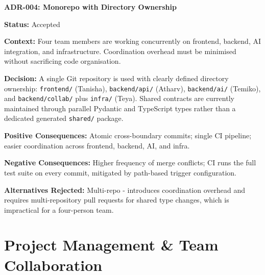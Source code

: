\documentclass{article}
\begin{document}
\vspace{15pt}
\noindent\textbf{ADR-004: Monorepo with Directory Ownership}

\vspace{3pt}
\noindent\textbf{Status:} Accepted

\vspace{3pt}
\noindent\textbf{Context:} Four team members are working concurrently on frontend, backend, AI integration, and infrastructure. Coordination overhead must be minimised without sacrificing code organisation.

\vspace{3pt}
\noindent\textbf{Decision:} A single Git repository is used with clearly defined directory ownership: \texttt{frontend/} (Tanisha), \texttt{backend/api/} (Atharv), \texttt{backend/ai/} (Temiko), and \texttt{backend/collab/} plus \texttt{infra/} (Teya). Shared contracts are currently maintained through parallel Pydantic and TypeScript types rather than a dedicated generated \texttt{shared/} package.

\vspace{3pt}
\noindent\textbf{Positive Consequences:} Atomic cross-boundary commits; single CI pipeline; easier coordination across frontend, backend, AI, and infra.

\vspace{3pt}
\noindent\textbf{Negative Consequences:} Higher frequency of merge conflicts; CI runs the full test suite on every commit, mitigated by path-based trigger configuration.

\vspace{3pt}
\noindent\textbf{Alternatives Rejected:} Multi-repo - introduces coordination overhead and requires multi-repository pull requests for shared type changes, which is impractical for a four-person team.


















\section{Project Management \& Team Collaboration}
\end{document}
